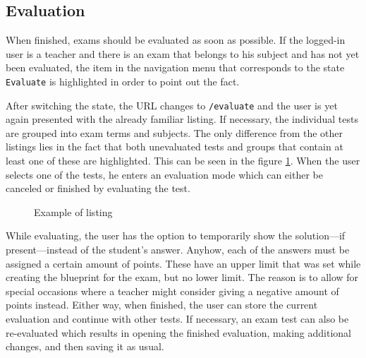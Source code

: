 \documentclass[thesis=M,english,hidelinks]{FITthesis}[2012/10/20]
\newcommand{\code}{\texttt}
\begin{document}
    \subsection{Evaluation}

When finished, exams should be evaluated as soon as possible. If the logged-in user is a teacher and there is an exam that belongs to his subject and has not yet been evaluated, the item in the navigation menu that corresponds to the state \code{Evaluate} is highlighted in order to point out the fact.

After switching the state, the URL changes to \code{/evaluate} and the user is yet again presented with the already familiar listing. If necessary, the individual tests are grouped into exam terms and subjects. The only difference from the other listings lies in the fact that both unevaluated tests and groups that contain at least one of these are highlighted. This can be seen in the figure \ref{fig:listing}. When the user selects one of the tests, he enters an evaluation mode which can either be canceled or finished by evaluating the test.

\begin{figure}
  \setlength\fboxsep{0pt}
  \setlength\fboxrule{0.2pt}
  \caption{Example of listing}
  \label{fig:listing}
\end{figure}

While evaluating, the user has the option to temporarily show the solution---if present---instead of the student's answer. Anyhow, each of the answers must be assigned a certain amount of points. These have an upper limit that was set while creating the blueprint for the exam, but no lower limit. The reason is to allow for special occasions where a teacher might consider giving a negative amount of points instead. Either way, when finished, the user can store the current evaluation and continue with other tests. If necessary, an exam test can also be re-evaluated which results in opening the finished evaluation, making additional changes, and then saving it as usual.
\end{document}
